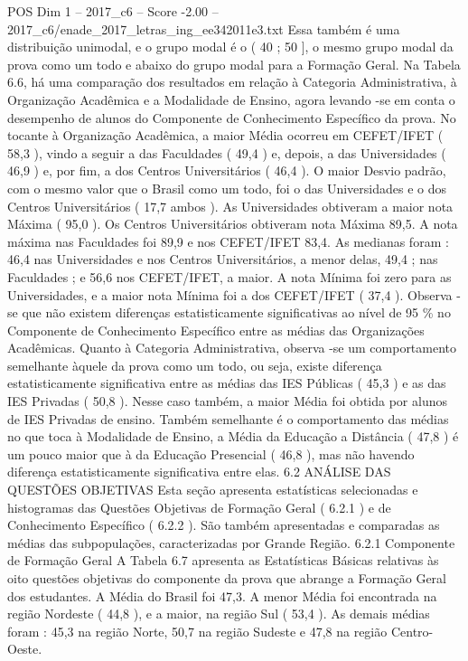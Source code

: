 \begin{textsample}{POS Dim 1 – 2017\_c6 – Score -2.00 – 2017\_c6/enade\_2017\_letras\_ing\_ee342011e3.txt}
Essa também é uma distribuição unimodal, e o grupo modal é o ( 40 ; 50 ], o mesmo grupo modal da prova como um todo e abaixo do grupo modal para a Formação Geral.
Na Tabela 6.6, há uma comparação dos resultados em relação à Categoria Administrativa, à Organização Acadêmica e a Modalidade de Ensino, agora levando -se em conta o desempenho de alunos do Componente de Conhecimento Específico da prova.
No tocante à Organização Acadêmica, a maior Média ocorreu em CEFET/IFET ( 58,3 ), vindo a seguir a das Faculdades ( 49,4 ) e, depois, a das Universidades ( 46,9 ) e, por fim, a dos Centros Universitários ( 46,4 ).
O maior Desvio padrão, com o mesmo valor que o Brasil como um todo, foi o das Universidades e o dos Centros Universitários ( 17,7 ambos ).
As Universidades obtiveram a maior nota Máxima ( 95,0 ).
Os Centros Universitários obtiveram nota Máxima 89,5.
A nota máxima nas Faculdades foi 89,9 e nos CEFET/IFET 83,4.
As medianas foram : 46,4 nas Universidades e nos Centros Universitários, a menor delas, 49,4 ; nas Faculdades ; e 56,6 nos CEFET/IFET, a maior.
A nota Mínima foi zero para as Universidades, e a maior nota Mínima foi a dos CEFET/IFET ( 37,4 ).
Observa -se que não existem diferenças estatisticamente significativas ao nível de 95 \% no Componente de Conhecimento Específico entre as médias das Organizações Acadêmicas.
Quanto à Categoria Administrativa, observa -se um comportamento semelhante àquele da prova como um todo, ou seja, existe diferença estatisticamente significativa entre as médias das IES Públicas ( 45,3 ) e as das IES Privadas ( 50,8 ).
Nesse caso também, a maior Média foi obtida por alunos de IES Privadas de ensino.
Também semelhante é o comportamento das médias no que toca à Modalidade de Ensino, a Média da Educação a Distância ( 47,8 ) é um pouco maior que à da Educação Presencial ( 46,8 ), mas não havendo diferença estatisticamente significativa entre elas. 6.2 ANÁLISE DAS QUESTÕES OBJETIVAS Esta seção apresenta estatísticas selecionadas e histogramas das Questões Objetivas de Formação Geral ( 6.2.1 ) e de Conhecimento Específico ( 6.2.2 ).
São também apresentadas e comparadas as médias das subpopulações, caracterizadas por Grande Região. 6.2.1 Componente de Formação Geral A Tabela 6.7 apresenta as Estatísticas Básicas relativas às oito questões objetivas do componente da prova que abrange a Formação Geral dos estudantes.
A Média do Brasil foi 47,3.
A menor Média foi encontrada na região Nordeste ( 44,8 ), e a maior, na região Sul ( 53,4 ).
As demais médias foram : 45,3 na região Norte, 50,7 na região Sudeste e 47,8 na região Centro-Oeste.

\end{textsample}
